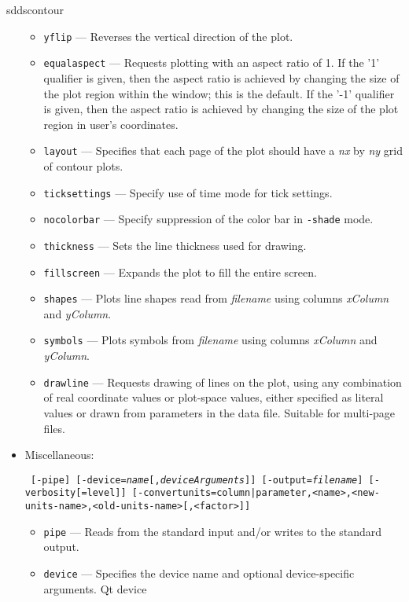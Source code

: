 \begin{sddsprog}{sddscontour}
\begin{itemize}
\begin{itemize}
        \item \verb|yflip| --- Reverses the vertical direction of the plot.
        \item \verb|equalaspect| --- Requests plotting with an aspect ratio of 1.  If the '1' qualifier
        is given, then the aspect ratio is achieved by changing the size of the plot region within the window;
        this is the default.
        If the '-1' qualifier is given, then the aspect ratio is achieved by changing the size of the plot region
        in user's coordinates.
        \item \verb|layout| --- Specifies that each page of the plot should have a {\em nx} by {\em ny} grid of contour plots.
        \item \verb|ticksettings| --- Specify use of time mode for tick settings.
        \item \verb|nocolorbar| --- Specify suppression of the color bar in \verb|-shade| mode.
        \item \verb|thickness| --- Sets the line thickness used for drawing.
        \item \verb|fillscreen| --- Expands the plot to fill the entire screen.
        \item \verb|shapes| --- Plots line shapes read from {\em filename} using columns {\em xColumn} and {\em yColumn}.
        \item \verb|symbols| --- Plots symbols from {\em filename} using columns {\em xColumn} and {\em yColumn}.
        \item \verb|drawline| --- Requests drawing of lines on the plot, using any combination of real coordinate values
          or plot-space values, either specified as literal values or drawn from parameters in the data file.
          Suitable for multi-page files.
        \end{itemize}
    \item Miscellaneous:
\begin{flushleft}{\tt
[-pipe] [-device={\em name}[,{\em deviceArguments}]]
[-output={\em filename}] [-verbosity[=level]]
[-convertunits={column|parameter},<name>,<new-units-name>,<old-units-name>[,<factor>]]
}\end{flushleft}
        \begin{itemize}
        \item \verb|pipe| --- Reads from the standard input and/or writes to the standard output.
        \item \verb|device| --- Specifies the device name and optional device-specific arguments. Qt device

\end{itemize}
\end{itemize}
\end{sddsprog}
